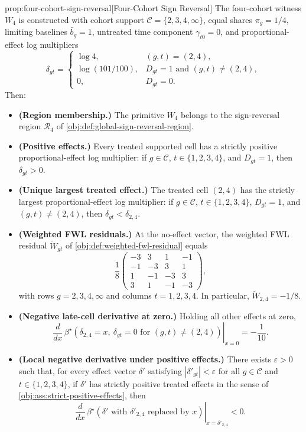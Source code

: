 \documentclass[11pt]{article}
\begin{document}
\begin{theoremv}{prop:four-cohort-sign-reversal}[Four-Cohort Sign Reversal]
The four-cohort witness \(W_4\) is constructed with cohort support
\(\mathcal C=\{2,3,4,\infty\}\), equal shares \(\pi_g=1/4\), limiting baselines
\(\bar b_g=1\), untreated time component \(\gamma_{t0}=0\), and proportional-effect
log multipliers
\[
\delta_{gt}=
\begin{cases}
\log 4, & (g,t)=(2,4),\\
\log(101/100), & D_{gt}=1 \text{ and } (g,t)\neq(2,4),\\
0, & D_{gt}=0 .
\end{cases}
\]
Then:
\begin{itemize}
\item \textbf{(Region membership.)} The primitive \(W_4\) belongs to the sign-reversal region \(\mathcal R_4\) of \cref{obj:def:global-sign-reversal-region}.
\item \textbf{(Positive effects.)} Every treated supported cell has a strictly positive proportional-effect log multiplier: if \(g\in\mathcal C\), \(t\in\{1,2,3,4\}\), and \(D_{gt}=1\), then \(\delta_{gt}>0\).
\item \textbf{(Unique largest treated effect.)} The treated cell \((2,4)\) has the strictly largest proportional-effect log multiplier: if \(g\in\mathcal C\), \(t\in\{1,2,3,4\}\), \(D_{gt}=1\), and \((g,t)\neq(2,4)\), then \(\delta_{gt}<\delta_{2,4}\).
\item \textbf{(Weighted FWL residuals.)} At the no-effect vector, the weighted FWL residual \(\widetilde W_{gt}\) of \cref{obj:def:weighted-fwl-residual} equals
\[
\frac{1}{8}
\begin{pmatrix}
-3 & 3 & 1 & -1\\
-1 & -3 & 3 & 1\\
1 & -1 & -3 & 3\\
3 & 1 & -1 & -3
\end{pmatrix},
\]
with rows \(g=2,3,4,\infty\) and columns \(t=1,2,3,4\). In particular, \(\widetilde W_{2,4}=-1/8\).
\item \textbf{(Negative late-cell derivative at zero.)} Holding all other effects at zero,
\[
\left.\frac{d}{dx}\,
\beta^\star\!\left(\delta_{2,4}=x,\ \delta_{gt}=0\text{ for }(g,t)\neq(2,4)\right)
\right|_{x=0}
=-\frac{1}{10}.
\]
\item \textbf{(Local negative derivative under positive effects.)} There exists \(\varepsilon>0\) such that, for every effect vector \(\delta'\) satisfying \(|\delta'_{gt}|<\varepsilon\) for all \(g\in\mathcal C\) and \(t\in\{1,2,3,4\}\), if \(\delta'\) has strictly positive treated effects in the sense of \cref{obj:ass:strict-positive-effects}, then
\[
\left.
\frac{d}{dx}\,
\beta^\star\!\left(\delta' \text{ with } \delta'_{2,4}\text{ replaced by }x\right)
\right|_{x=\delta'_{2,4}}
<0 .
\]
\end{itemize}
\end{theoremv}
\end{document}
